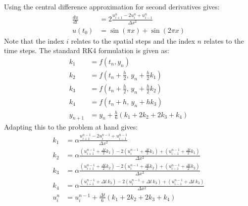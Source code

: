 \documentclass{article}
\begin{document}
Using the central difference approximation for second derivatives gives:
\begin{equation}
    \begin{aligned}
        \frac{du}{dt} &= 2\frac{u_{i+1}^n - 2u_i^n + u_{i-1}^n}{\Delta x^2}\\
        u(t_0) &= \sin(\pi x) + \sin(2\pi x)
    \end{aligned}
\end{equation}
Note that the index $i$ relates to the spatial steps and the index $n$ relates to the time steps. The standard RK4 formulation is given as:
\begin{equation}
    \begin{aligned}
        k_1 &= f(t_n, y_n) \\
        k_2 &= f\left(t_n + \frac{h}{2},\, y_n + \frac{h}{2}k_1\right) \\
        k_3 &= f\left(t_n + \frac{h}{2},\, y_n + \frac{h}{2}k_2\right) \\
        k_4 &= f(t_n + h,\, y_n + hk_3) \\
        y_{n+1} &= y_n + \frac{h}{6}\left(k_1 + 2k_2 + 2k_3 + k_4\right)
    \end{aligned}
\end{equation}
Adapting this to the problem at hand gives:
\begin{equation}
    \begin{aligned}
        k_1 &= \alpha \frac{u_{i+1}^{n-1} - 2u_i^{n-1} + u_{i-1}^{n-1}}{\Delta x^2} \\
        k_2 &= \alpha \frac{
            \left(u_{i+1}^{n-1} + \frac{\Delta t}{2}k_1\right)
            - 2\left(u_i^{n-1} + \frac{\Delta t}{2}k_1\right)
            + \left(u_{i-1}^{n-1} + \frac{\Delta t}{2}k_1\right)
        }{\Delta x^2} \\
        k_3 &= \alpha \frac{
            \left(u_{i+1}^{n-1} + \frac{\Delta t}{2}k_2\right)
            - 2\left(u_i^{n-1} + \frac{\Delta t}{2}k_2\right)
            + \left(u_{i-1}^{n-1} + \frac{\Delta t}{2}k_2\right)
        }{\Delta x^2} \\
        k_4 &= \alpha \frac{
            \left(u_{i+1}^{n-1} + \Delta t\, k_3\right)
            - 2\left(u_i^{n-1} + \Delta t\, k_3\right)
            + \left(u_{i-1}^{n-1} + \Delta t\, k_3\right)
        }{\Delta x^2} \\
        u_i^{n} &= u_i^{n-1} + \frac{\Delta t}{6} \left( k_1 + 2k_2 + 2k_3 + k_4 \right)
    \end{aligned}
\end{equation}
\end{document}
